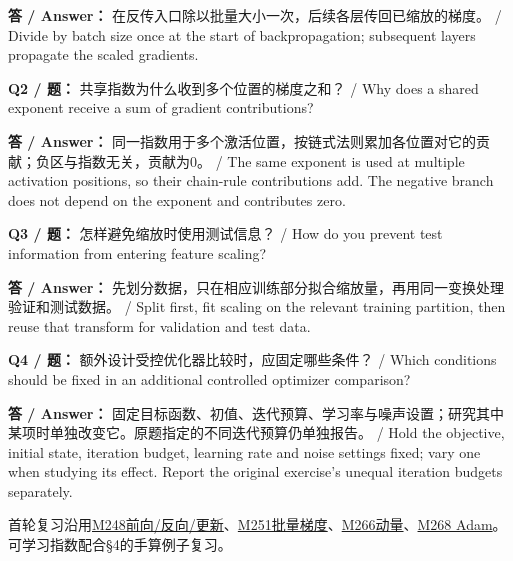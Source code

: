 \textbf{答 / Answer：} 在反传入口除以批量大小一次，后续各层传回已缩放的梯度。 / Divide by batch size once at the start of backpropagation; subsequent layers propagate the scaled gradients.

\textbf{Q2 / 题：} 共享指数为什么收到多个位置的梯度之和？ / Why does a shared exponent receive a sum of gradient contributions?

\textbf{答 / Answer：} 同一指数用于多个激活位置，按链式法则累加各位置对它的贡献；负区与指数无关，贡献为0。 / The same exponent is used at multiple activation positions, so their chain-rule contributions add. The negative branch does not depend on the exponent and contributes zero.

\textbf{Q3 / 题：} 怎样避免缩放时使用测试信息？ / How do you prevent test information from entering feature scaling?

\textbf{答 / Answer：} 先划分数据，只在相应训练部分拟合缩放量，再用同一变换处理验证和测试数据。 / Split first, fit scaling on the relevant training partition, then reuse that transform for validation and test data.

\textbf{Q4 / 题：} 额外设计受控优化器比较时，应固定哪些条件？ / Which conditions should be fixed in an additional controlled optimizer comparison?

\textbf{答 / Answer：} 固定目标函数、初值、迭代预算、学习率与噪声设置；研究其中某项时单独改变它。原题指定的不同迭代预算仍单独报告。 / Hold the objective, initial state, iteration budget, learning rate and noise settings fixed; vary one when studying its effect. Report the original exercise's unequal iteration budgets separately.


首轮复习沿用\href{https://crazyshout.github.io/micro-course/cards.html\#CS5489-M248}{M248前向/反向/更新}、\href{https://crazyshout.github.io/micro-course/cards.html\#CS5489-M251}{M251批量梯度}、\href{https://crazyshout.github.io/micro-course/cards.html\#CS5489-M266}{M266动量}、\href{https://crazyshout.github.io/micro-course/cards.html\#CS5489-M268}{M268 Adam}。可学习指数配合§4的手算例子复习。





